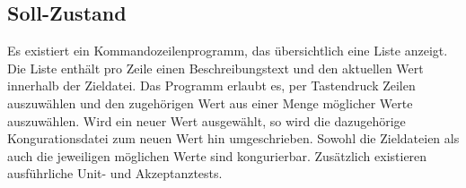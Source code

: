 \subsection{Soll-Zustand}
Es existiert ein Kommandozeilenprogramm, das übersichtlich eine
Liste anzeigt. Die Liste enthält pro Zeile einen Beschreibungstext
und den aktuellen Wert innerhalb der Zieldatei. Das Programm
erlaubt es, per Tastendruck Zeilen auszuwählen und den
zugehörigen Wert aus einer Menge möglicher Werte auszuwählen.
Wird ein neuer Wert ausgewählt, so wird die dazugehörige
Kongurationsdatei zum neuen Wert hin umgeschrieben. Sowohl die Zieldateien als
auch die jeweiligen möglichen Werte sind kongurierbar.
Zusätzlich existieren ausführliche Unit- und Akzeptanztests.